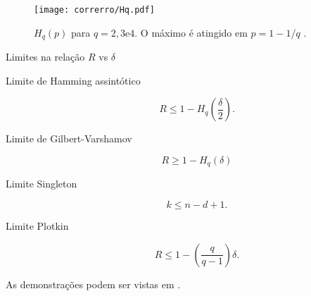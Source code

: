 \begin{frame}[allowframebreaks]
  \framebreak

    \begin{figure}
    \centering
    \texttt{[image: correrro/Hq.pdf]}
    \caption{$H_q(p)$ para $q=2,3 \text{e} 4$. O máximo é atingido em $p=1-1/q$ \citep{guruswami2023}.}\label{fig-Hq}
    \end{figure}

  \framebreak
  \begin{block}{Limites na relação $R$ vs $\delta$}
    \begin{description}
      \item[Limite de Hamming assintótico]
        \begin{equation}
          R \leq 1 - H_q\left( \frac{\delta}{2} \right).
        \end{equation}
      \item[Limite de Gilbert-Varshamov]
        \begin{equation}
          R \geq 1 - H_q(\delta)
        \end{equation}
      \item[Limite Singleton]
        \begin{equation}
          k \leq n - d + 1.
        \end{equation}
      \item[Limite Plotkin]
        \begin{equation}
          R \leq 1 - \left( \frac{q}{q-1} \right) \delta.
        \end{equation}
    \end{description}

    As demonstrações podem ser vistas em \cite{guruswami2023}.
  \end{block}
\end{frame}


